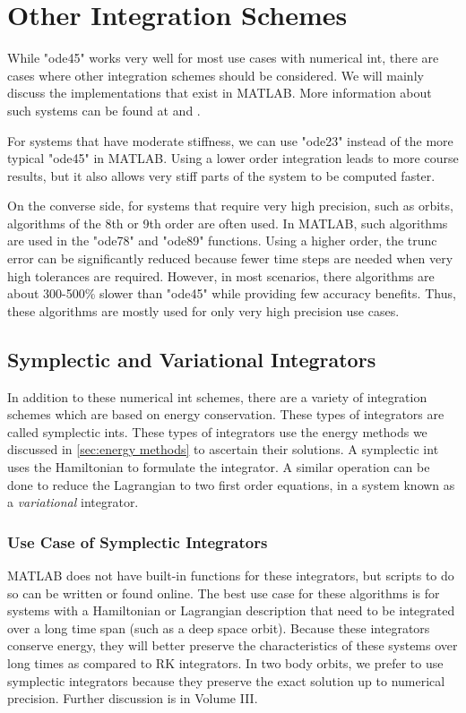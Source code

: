\documentclass[10pt, openany, titlepage]{book}
\theoremstyle{definition}
\let\oldautoref\autoref
\renewcommand{\autoref}[1]{%
  \begingroup
  \hypersetup{linkcolor=black}%
  \oldautoref{#1}%
  \endgroup
}
\begin{document}
\section{Other Integration Schemes}
While "ode45" works very well for most use cases with \gls{numerical int}, there are cases where other integration schemes should be considered. We will mainly discuss the implementations that exist in MATLAB. More information about such systems can be found at \cite{mathworks_choose_2024} and \cite{mathworks_summary_2024}.

For systems that have moderate stiffness, we can use "ode23" instead of the more typical "ode45" in MATLAB. Using a lower order integration leads to more course results, but it also allows very \gls{stiff} parts of the system to be computed faster.

On the converse side, for systems that require very high precision, such as orbits, algorithms of the 8th or 9th order are often used. In MATLAB, such algorithms are used in the "ode78" and "ode89" functions. Using a higher order, the \gls{trunc error} can be significantly reduced because fewer time steps are needed when very high tolerances are required. However, in most scenarios, there algorithms are about 300-500\% slower than "ode45" while providing few accuracy benefits. Thus, these algorithms are mostly used for only very high precision use cases.

\subsection{Symplectic and Variational Integrators}
In addition to these \gls{numerical int} schemes, there are a variety of integration schemes which are based on energy conservation. These types of integrators are called \glspl{symplectic int}. These types of integrators use the energy methods we discussed in \autoref{sec:energy methods} to ascertain their solutions. A \gls{symplectic int} uses the Hamiltonian to formulate the integrator. A similar operation can be done to reduce the \gls{Lagrangian} to two first order equations, in a system known as a\textit{ variational} integrator.

\subsubsection{Use Case of Symplectic Integrators}
MATLAB does not have built-in functions for these integrators, but scripts to do so can be written or found online. The best use case for these algorithms is for systems with a Hamiltonian or Lagrangian description that need to be integrated over a long time span (such as a deep space orbit). Because these integrators conserve energy, they will better preserve the characteristics of these systems over long times as compared to RK integrators. In two body orbits, we prefer to use symplectic integrators because they preserve the exact solution up to numerical precision. Further discussion is in Volume III.
\end{document}
